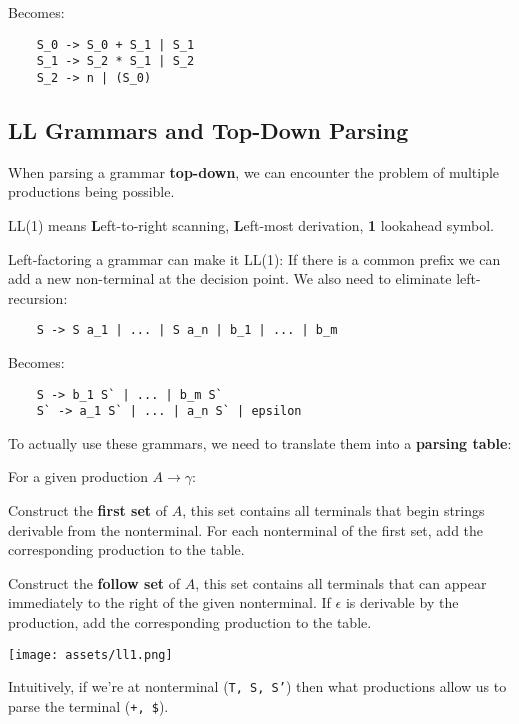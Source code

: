 Becomes:\smallskip

\begin{lstlisting}
	S_0 -> S_0 + S_1 | S_1
	S_1 -> S_2 * S_1 | S_2
	S_2 -> n | (S_0)
\end{lstlisting}


\subsection*{LL Grammars and Top-Down Parsing}

When parsing a grammar \textbf{top-down}, we can encounter the problem of multiple productions being possible. \medskip

LL(1) means \textbf{L}eft-to-right scanning, \textbf{L}eft-most derivation, \textbf{1} lookahead symbol. \medskip

Left-factoring a grammar can make it LL(1): If there is a common prefix we can add a new non-terminal at the decision point. We also need to eliminate left-recursion:\smallskip

\begin{lstlisting}
 	S -> S a_1 | ... | S a_n | b_1 | ... | b_m
\end{lstlisting}\smallskip

Becomes:\smallskip

\begin{lstlisting}		
	S -> b_1 S` | ... | b_m S`		
	S` -> a_1 S` | ... | a_n S` | epsilon
\end{lstlisting}\medskip


\columnbreak


To actually use these grammars, we need to translate them into a \textbf{parsing table}: \medskip

For a given production $A \to \gamma$:
\begin{compactitem}[$\quad\bullet$]
	\item Construct the \textbf{first set} of $A$, this set contains all terminals that begin strings derivable from the nonterminal. For each nonterminal of the first set, add the corresponding production to the table.

	\item Construct the \textbf{follow set} of $A$, this set contains all terminals that can appear immediately to the right of the given nonterminal. If $\epsilon$ is derivable by the production, add the corresponding production to the table.
\end{compactitem}

\begin{center}
	\texttt{[image: assets/ll1.png]}
\end{center}
\vspace{-10pt}
Intuitively, if we're at nonterminal (\texttt{T, S, S'}) then what productions allow us to parse the terminal (\texttt{+, \$}).

